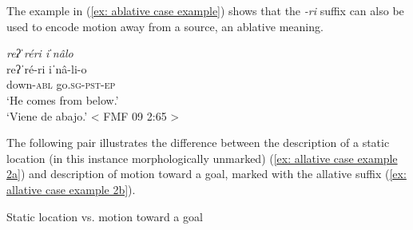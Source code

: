 
The example in (\ref{ex: ablative case example}) shows that the \textit{-ri} suffix can also be used to encode motion away from a source, an ablative meaning.

\ea\label{ex: ablative case example}

    {\textit{reʔˈréri    iˈnâlo}}\\
    \gll    reʔˈré-ri    iˈnâ-li-o\\
            down-\textsc{abl} go.\textsc{sg}-\textsc{pst-ep}\\
    \glt    `He comes from below.’\\
    \glt    ‘Viene de abajo.’    < FMF 09 2:65 >\\

\z

The following pair illustrates the difference between the description of a static location (in this instance morphologically unmarked) (\ref{ex: allative case example 2a}) and description of motion toward a goal, marked with the allative suffix (\ref{ex: allative case example 2b}).

\ea\label{ex: allative case example 2}
{Static location vs. motion toward a goal}

    \label{ex: allative case example 2a}
        \label{ex: allative case example 2b}
    \z
\z


